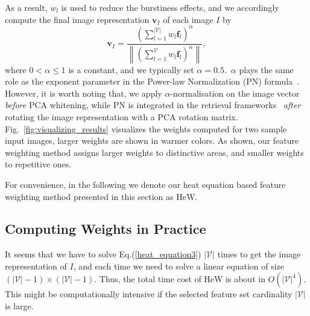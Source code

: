 \documentclass[journal]{IEEEtran}
\begin{document}
As a result, $w_l$ is used to reduce the burstiness effects,
and we accordingly compute the final image representation $\boldsymbol{v}_I$ of each image $I$ by
\begin{equation}\label{representation_equation}
\boldsymbol{v}_I = \frac{\left(\sum_{l=1}^{|\mathcal {V}|}w_l\boldsymbol{f}_l\right)^{\alpha}}{\left\|\left(\sum_{l=1}^{\mathcal {V}}
w_l\boldsymbol{f}_l\right)^{\alpha}\right\|},
\end{equation}
where $0 < \alpha \leq 1$ is a constant, and we typically set $\alpha = 0.5$.~$\alpha$ plays the same role as the exponent parameter in the Power-law Normalization (PN) formula~\cite{perronnin2010improving}.
However, it is worth noting that, we apply $\alpha$-normalisation on the image vector \emph{before} PCA whitening,
while PN is integrated in the retrieval frameworks~\cite{murray2017interferences,do2017embedding}
\emph{after} rotating the image representation with a PCA rotation matrix. Fig.~\ref{fig:visualizing_results} visualizes the weights computed for two sample input images, larger weights are shown in warmer colors. As shown, our feature weighting method assigns larger weights to distinctive areas, and smaller weights to repetitive ones.

For convenience, in the following we denote our heat equation based feature weighting method presented in this section as HeW.


\subsection{Computing Weights in Practice}
It seems that we have to solve Eq.(\ref{heat_equation3}) $|\mathcal {V}|$ times to get the image representation of $I$, and each time
we need to solve a linear equation of size $(|\mathcal {V}|-1)\times (|\mathcal {V}|-1)$.
Thus, the total time cost of HeW is about in $O(|\mathcal {V}|^4)$.
This might be computationally intensive if the selected feature set cardinality $|\mathcal {V}|$ is large.
\end{document}

